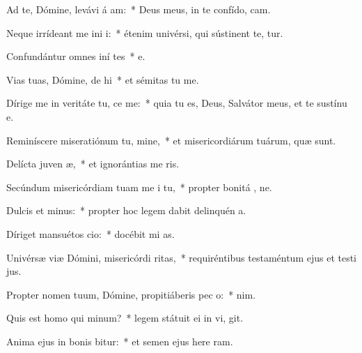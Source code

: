 \item Ad te, Dómine, levávi á am:~* Deus meus, in te confído,  cam.
\item Neque irrídeant me ini i:~* étenim univérsi, qui sústinent te,  tur.
\item Confundántur omnes iní tes~* e.
\item Vias tuas, Dómine, de hi~* et sémitas tu  me.
\item Dírige me in veritáte tu,  ce me:~* quia tu es, Deus, Salvátor meus, et te sustínu  e.
\item Reminíscere miseratiónum tu, mine,~* et misericordiárum tuárum, quæ   sunt.
\item Delícta juven æ,~* et ignorántias me  ris.
\item Secúndum misericórdiam tuam me i tu,~* propter bonitá , ne.
\item Dulcis et  minus:~* propter hoc legem dabit delinquén  a.
\item Díriget mansuétos  cio:~* docébit mi  as.
\item Univérsæ viæ Dómini, misericórdi  ritas,~* requiréntibus testaméntum ejus et testi jus.
\item Propter nomen tuum, Dómine, propitiáberis pec o:~*   nim.
\item Quis est homo qui  minum?~* legem státuit ei in vi,  git.
\item Anima ejus in bonis bitur:~* et semen ejus here ram.
